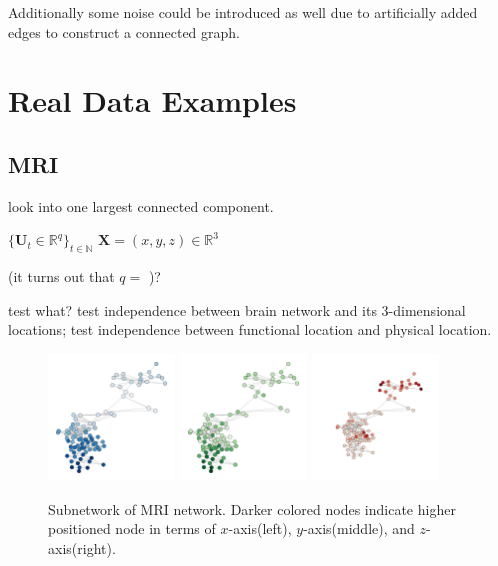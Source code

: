 \documentclass[12pt]{article}
\theoremstyle{definition}
\begin{document}
Additionally some noise could be introduced as well due to artificially added edges to construct a connected graph.






\newpage
\section{Real Data Examples}
\label{sec:real}

\subsection{MRI}

look into one largest connected component. 

$\{ \mathbf{U}_{t} \in \mathbb{R}^{q} \}_{t \in \mathbb{N}}$ $\mathbf{X} = (x,y,z) \in \mathbb{R}^{3}$

(it turns out that $q=$ )?

test what? test independence between brain network and its 3-dimensional locations; test independence between functional location and physical location. 

\begin{figure}[H]
	\label{fig:mri}
\includegraphics[width = 0.3\textwidth]{../Figure/brain1_x.pdf}
\includegraphics[width = 0.3\textwidth]{../Figure/brain1_y.pdf}
\includegraphics[width = 0.3\textwidth]{../Figure/brain1_z.pdf}
\caption{Subnetwork of MRI network. Darker colored nodes indicate higher positioned node in terms of $x$-axis(left), $y$-axis(middle), and $z$-axis(right).}
\end{figure}
\end{document}

